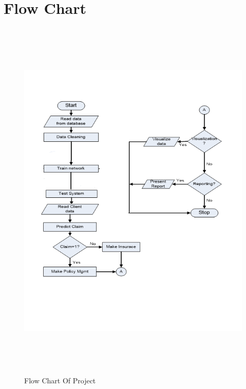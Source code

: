 \section{Flow Chart}
\begin{figure}[tbh] %
\begin{center}
	\includegraphics[height=7in]{images/systemflow.png}
	\caption{Flow Chart Of Project} %
	
	\label{Flow Chart} %
\end{center}
\end{figure}


\pagebreak
\newpage
